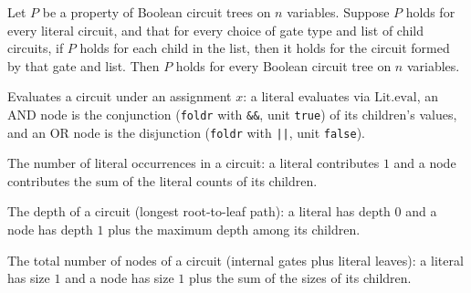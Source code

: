 \begin{theorem}
\label{BoolCircuit.TreeCircuit.ind}
\leanok
{}
Let $P$ be a property of Boolean circuit trees on $n$ variables. Suppose $P$ holds for
every literal circuit, and that for every choice of gate type and list of child
circuits, if $P$ holds for each child in the list, then it holds for the circuit formed
by that gate and list. Then $P$ holds for every Boolean circuit tree on $n$ variables.
\end{theorem}

\begin{definition}
\label{BoolCircuit.TreeCircuit.eval}
\leanok
{}
Evaluates a circuit under an assignment $x$: a literal evaluates via
$\mathrm{Lit.eval}$, an AND node is the conjunction (\texttt{foldr} with \texttt{\&\&},
unit \texttt{true}) of its children's values, and an OR node is the disjunction
(\texttt{foldr} with \texttt{||}, unit \texttt{false}).
\end{definition}

\begin{definition}
\label{BoolCircuit.TreeCircuit.litCount}
\leanok
{}
The number of literal occurrences in a circuit: a literal contributes $1$ and a node
contributes the sum of the literal counts of its children.
\end{definition}

\begin{definition}
\label{BoolCircuit.TreeCircuit.depth}
\leanok
{}
The depth of a circuit (longest root-to-leaf path): a literal has depth $0$ and a node
has depth $1$ plus the maximum depth among its children.
\end{definition}

\begin{definition}
\label{BoolCircuit.TreeCircuit.size}
\leanok
{}
The total number of nodes of a circuit (internal gates plus literal leaves): a literal
has size $1$ and a node has size $1$ plus the sum of the sizes of its children.
\end{definition}

